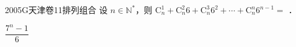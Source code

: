 
\begin{problem}{2005}{G}{天津卷}{11}{排列组合}
设 $ n\in\mathbb{N}^* $，则 $ \mathrm{C}_n^1+\mathrm{C}_n^2 6+\mathrm{C}_n^3 6^2+\cdots+\mathrm{C}_n^n 6^{n-1}=$\underline{\hspace{4em}} ．
\end{problem}

\begin{answer}
$\dfrac{7^n-1}{6}$
\end{answer}

\begin{solutions}

\end{solutions}